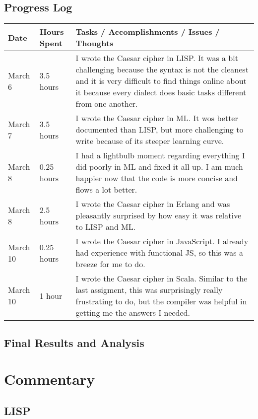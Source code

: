 \documentclass[letterpaper, 10pt, DIV=13]{scrartcl}
\numberwithin{equation}{section}
\numberwithin{figure}{section}
\numberwithin{table}{section}
\begin{document}
\subsection{Progress Log}
\begin{center}
	\begin{longtable}{|p{1in}|p{1in}|p{4in}|}
		\hline
		Date & Hours Spent & Tasks / Accomplishments / Issues / Thoughts
		\\
		\hline
        March 6 & 3.5 hours & I wrote the Caesar cipher in LISP. It was a bit challenging because the syntax is not the cleanest and it is very 
        difficult to find things online about it because every dialect does basic tasks different from one another.
        \\
		\hline
        March 7 & 3.5 hours & I wrote the Caesar cipher in ML. It wos better documented than LISP, but more challenging to write because of its 
        steeper learning curve.
        \\
        \hline
        March 8 & 0.25 hours & I had a lightbulb moment regarding everything I did poorly in ML and fixed it all up. I am much happier now that the code is
        more concise and flows a lot better.
        \\
        \hline
        March 8 & 2.5 hours & I wrote the Caesar cipher in Erlang and was pleasantly surprised by how easy it was relative to LISP and ML.
        \\
        \hline
        March 10 & 0.25 hours & I wrote the Caesar cipher in JavaScript. I already had experience with functional JS, so this was a breeze for me to do.
        \\
        \hline
        March 10 & 1 hour & I wrote the Caesar cipher in Scala. Similar to the last assigment, this was surprisingly really frustrating to do, but the compiler
        was helpful in getting me the answers I needed.
        \\
        \hline
	\end{longtable}
\end{center}

\subsection{Final Results and Analysis}

\section{Commentary}
\subsection{LISP}
\end{document}
